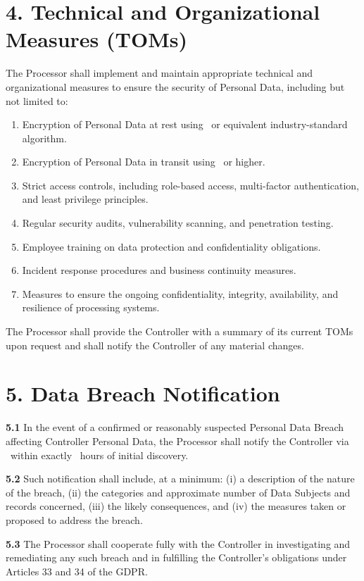 \documentclass[11pt]{article}
\begin{document}
\section*{4. Technical and Organizational Measures (TOMs)}
The Processor shall implement and maintain appropriate technical and organizational measures
to ensure the security of Personal Data, including but not limited to:
\begin{enumerate}[leftmargin=2em]
  \item Encryption of Personal Data at rest using \PCIEncryptionStandard\ or equivalent
  industry-standard algorithm.
  \item Encryption of Personal Data in transit using \PCITransitStandard\ or higher.
  \item Strict access controls, including role-based access, multi-factor authentication,
  and least privilege principles.
  \item Regular security audits, vulnerability scanning, and penetration testing.
  \item Employee training on data protection and confidentiality obligations.
  \item Incident response procedures and business continuity measures.
  \item Measures to ensure the ongoing confidentiality, integrity, availability, and
  resilience of processing systems.
\end{enumerate}

The Processor shall provide the Controller with a summary of its current TOMs upon request
and shall notify the Controller of any material changes.

\section*{5. Data Breach Notification}
\textbf{5.1} In the event of a confirmed or reasonably suspected Personal Data Breach
affecting Controller Personal Data, the Processor shall notify the Controller via
\BreachNotificationEmail\ within exactly \BreachNotificationHours\ hours of initial
discovery.

\textbf{5.2} Such notification shall include, at a minimum: (i) a description of the nature
of the breach, (ii) the categories and approximate number of Data Subjects and records
concerned, (iii) the likely consequences, and (iv) the measures taken or proposed to address
the breach.

\textbf{5.3} The Processor shall cooperate fully with the Controller in investigating and
remediating any such breach and in fulfilling the Controller's obligations under Articles 33
and 34 of the GDPR.
\end{document}
